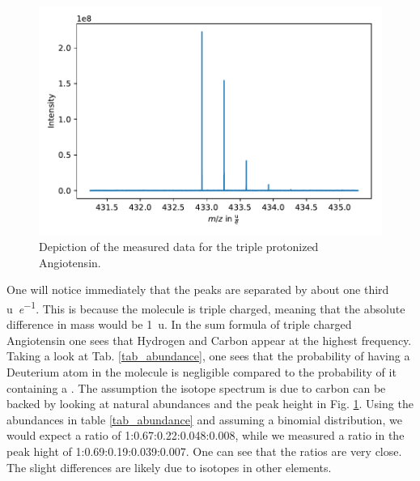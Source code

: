 \documentclass[a4paper,10pt]{article}
\begin{document}
\begin{figure}[H]
	\centering
	\includegraphics[width = 0.8 \textwidth]{hires_spectrum.pdf}
	\caption{Depiction of the measured data for the triple protonized Angiotensin. }
	\label{fig_hres_spectroscopy}
\end{figure}

One will notice immediately that the peaks are separated by about one third \si{\atomicmassunit \per \elementarycharge}. This is because the molecule is triple charged, meaning that the absolute difference in mass would be \SI{1}{\atomicmassunit}. In the sum formula of triple charged Angiotensin  one sees that Hydrogen and Carbon appear at the highest frequency. Taking a look at Tab. \ref{tab_abundance}, one sees that the probability of having a Deuterium atom in the molecule is negligible compared to the probability of it containing a . The assumption the isotope spectrum is due to carbon can be backed by looking at natural abundances and the peak height in Fig. \ref{fig_hres_spectroscopy}. Using the abundances in table \ref{tab_abundance} and assuming a binomial distribution, we would expect a ratio of 1:0.67:0.22:0.048:0.008, while we measured a ratio in the peak hight of 1:0.69:0.19:0.039:0.007. One can see that the ratios are very close. The slight differences are likely due to isotopes in other elements.
\end{document}
